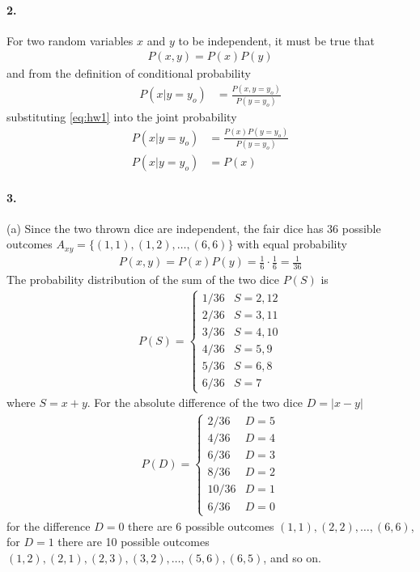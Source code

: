 \documentclass[../main.tex]{subfiles}
\begin{document}
\paragraph{2.} For two random variables $x$ and $y$ to be independent, it must be true that
\begin{align} \label{eq:hw1} \tag{1}
    P(x,y) = P(x)P(y)
\end{align}
and from the definition of conditional probability
\begin{align*}
    P(x|y=y_o) &= \frac{P(x,y=y_o)}{P(y=y_o)}
\end{align*}
substituting \eqref{eq:hw1} into the joint probability
\begin{align*}
    P(x|y=y_o) &= \frac{P(x)P(y=y_o)}{P(y=y_o)} \\
    P(x|y=y_o) &= P(x)
\end{align*}

\paragraph{3.}(a) Since the two thrown dice are independent, the fair dice has 36 possible outcomes
$A_{xy} = \{ (1,1), (1,2), \dots, (6,6) \}$ with equal probability
\begin{align*}
    P(x,y) = P(x)P(y) = \frac{1}{6} \cdot \frac{1}{6} = \frac{1}{36}
\end{align*}
The probability distribution of the sum of the two dice $P(S)$ is
\begin{align*}
    P(S) = \begin{cases}
        1/36 & S = 2, 12 \\
        2/36 & S = 3, 11 \\
        3/36 & S = 4, 10 \\
        4/36 & S = 5, 9 \\
        5/36 & S = 6, 8 \\
        6/36 & S = 7
    \end{cases}
\end{align*}
where $S = x + y$. For the absolute difference of the two dice $D = |x - y|$
\begin{align*}
    P(D) = \begin{cases}
        2/36 & D = 5 \\
        4/36 & D = 4 \\
        6/36 & D = 3 \\
        8/36 & D = 2 \\
        10/36 & D = 1 \\
        6/36 & D = 0
    \end{cases}
\end{align*}
for the difference $D = 0$ there are 6 possible outcomes $(1,1), (2,2), \dots, (6,6)$, for $D = 1$
there are 10 possible outcomes $(1,2), (2,1), (2,3), (3,2), \dots, (5,6), (6,5)$, and so on. 
\end{document}
